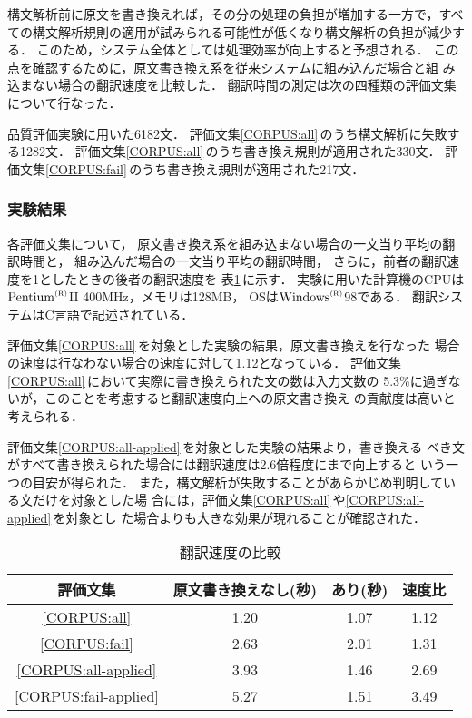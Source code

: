 構文解析前に原文を書き換えれば，その分の処理の負担が増加する一方で，すべ
ての構文解析規則の適用が試みられる可能性が低くなり構文解析の負担が減少す
る．
このため，システム全体としては処理効率が向上すると予想される．
この点を確認するために，原文書き換え系を従来システムに組み込んだ場合と組
み込まない場合の翻訳速度を比較した．
翻訳時間の測定は次の四種類の評価文集について行なった．
\begin{CORPUS}
\corpus 品質評価実験に用いた6182文．
\label{CORPUS:all}
\corpus 評価文集\ref{CORPUS:all}\,のうち構文解析に失敗する1282文．
\label{CORPUS:fail}
\corpus 評価文集\ref{CORPUS:all}\,のうち書き換え規則が適用された330文．
\label{CORPUS:all-applied}
\corpus 評価文集\ref{CORPUS:fail}\,のうち書き換え規則が適用された217文．
\label{CORPUS:fail-applied}
\end{CORPUS}

\subsubsection{実験結果}

各評価文集について，
原文書き換え系を組み込まない場合の一文当り平均の翻訳時間と，
組み込んだ場合の一文当り平均の翻訳時間，
さらに，前者の翻訳速度を1としたときの後者の翻訳速度を
表\ref{tab:result_efficiency}\,に示す．
実験に用いた計算機のCPUは$\mbox{Pentium}^{\mbox{\tiny{(R)}}}$II 400MHz，メモリは128MB，
OSは$\mbox{Windows}^{\mbox{\tiny{(R)}}}$98である．
翻訳システムはC言語で記述されている．

評価文集\ref{CORPUS:all}\,を対象とした実験の結果，原文書き換えを行なった
場合の速度は行なわない場合の速度に対して1.12となっている．
評価文集\ref{CORPUS:all}\,において実際に書き換えられた文の数は入力文数の
5.3\%に過ぎないが，このことを考慮すると翻訳速度向上への原文書き換え
の貢献度は高いと考えられる．

評価文集\ref{CORPUS:all-applied}\,を対象とした実験の結果より，書き換える
べき文がすべて書き換えられた場合には翻訳速度は2.6倍程度にまで向上すると
いう一つの目安が得られた．
また，構文解析が失敗することがあらかじめ判明している文だけを対象とした場
合には，評価文集\ref{CORPUS:all}\,や\ref{CORPUS:all-applied}\,を対象とし
た場合よりも大きな効果が現れることが確認された．
\begin{table}[htbp]
\caption{翻訳速度の比較}
\label{tab:result_efficiency}
\begin{center}
\begin{tabular}{|c|c|c|c|}\hline
評価文集 & 原文書き換えなし(秒) & あり(秒) & 速度比 \\\hline\hline
\ref{CORPUS:all}          & 1.20 & 1.07 & 1.12 \\
\ref{CORPUS:fail}         & 2.63 & 2.01 & 1.31 \\
\ref{CORPUS:all-applied}  & 3.93 & 1.46 & 2.69 \\
\ref{CORPUS:fail-applied} & 5.27 & 1.51 & 3.49 \\\hline
\end{tabular}
\end{center}
\end{table}

